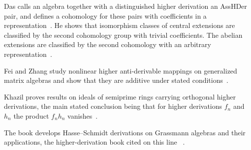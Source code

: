 Das calls an algebra together with a distinguished higher derivation an
AssHDer pair, and defines a cohomology for these pairs with coefficients in a
representation~\cite{WlExtensionsAndDeformationsOfAlg2022}. He shows that isomorphism classes of central extensions are
classified by the second cohomology group with trivial coefficients. The
abelian extensions are classified by the second cohomology with an arbitrary
representation~\cite{WlExtensionsAndDeformationsOfAlg2022}.

Fei and Zhang study nonlinear higher anti-derivable mappings on generalized
matrix algebras and show that they are additive under stated
conditions~\cite{WlAdditivityOfNonlinearHigherAnt2023}.

Khazil proves results on ideals of semiprime rings carrying orthogonal higher
derivations, the main stated conclusion being that for higher derivations
$f_n$ and $h_n$ the product $f_nh_n$
vanishes~\cite{WlIdealOfSemiPrimeRingsWithOrtho2021}.

The book develops Hasse--Schmidt derivations on Grassmann algebras and their
applications, the higher-derivation book cited on this line
~\cite{WlHasseSchmidtDerivationsOnGrass2020}.
